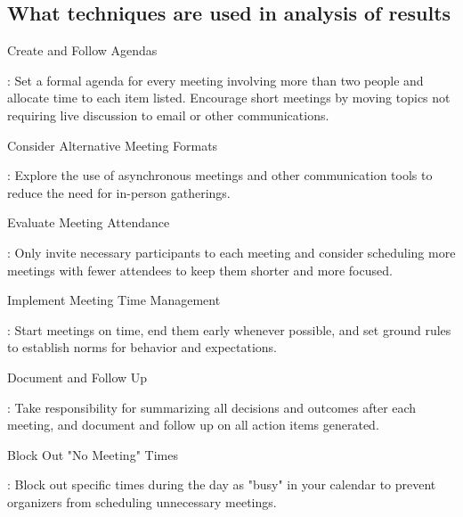 \subsection{What techniques are used in analysis of results}
\begin{enumerate}
{\bfseries \item Create and Follow Agendas}: Set a formal agenda for every meeting involving more than two people and allocate time to each item listed. Encourage short meetings by moving topics not requiring live discussion to email or other communications.
{\bfseries \item Consider Alternative Meeting Formats}: Explore the use of asynchronous meetings and other communication tools to reduce the need for in-person gatherings.
{\bfseries \item Evaluate Meeting Attendance}: Only invite necessary participants to each meeting and consider scheduling more meetings with fewer attendees to keep them shorter and more focused.
{\bfseries \item Implement Meeting Time Management}: Start meetings on time, end them early whenever possible, and set ground rules to establish norms for behavior and expectations.
{\bfseries \item Document and Follow Up}: Take responsibility for summarizing all decisions and outcomes after each meeting, and document and follow up on all action items generated.
{\bfseries \item Block Out "No Meeting" Times}: Block out specific times during the day as "busy" in your calendar to prevent organizers from scheduling unnecessary meetings.
\end{enumerate}
